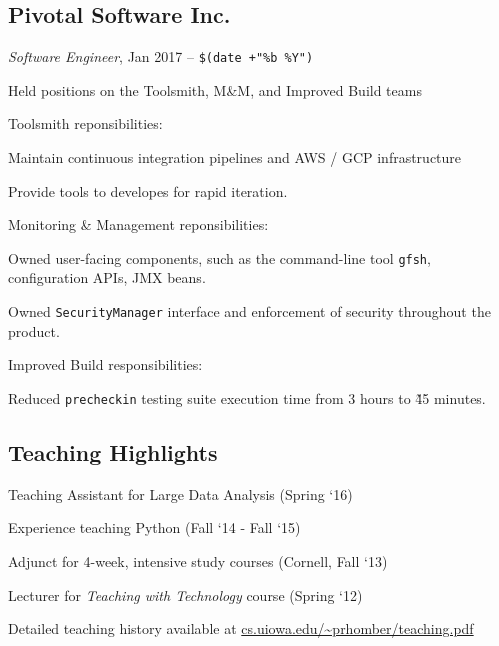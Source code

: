 \documentclass[10pt,letterpaper]{article}
\renewenvironment{itemize}{
  \begin{list}{}{
    \setlength{\leftmargin}{1.5em}
    \setlength{\itemsep}{0.25em}
    \setlength{\parskip}{0pt}
    \setlength{\parsep}{0.25em}
  }
}{
  \end{list}
}
\begin{document}
\subsection*{Pivotal Software Inc.}
\textit{Software Engineer}, Jan 2017 -- \verb!$(date +"%b %Y")!
\begin{itemize}
\item Held positions on the Toolsmith, M\&M, and Improved Build teams
\begin{itemize}
\item Toolsmith reponsibilities:
\begin{itemize}
\item Maintain continuous integration pipelines and AWS / GCP infrastructure
\item Provide tools to developes for rapid iteration.
\end{itemize}
\item Monitoring \& Management reponsibilities:
\begin{itemize}
\item Owned user-facing components, such as the command-line tool \verb!gfsh!, configuration APIs, JMX beans.
\item Owned \verb!SecurityManager! interface and enforcement of security throughout the product.
\end{itemize}
\item Improved Build responsibilities:
\begin{itemize}
\item Reduced \verb!precheckin! testing suite execution time from 3 hours to \~45 minutes.
\end{itemize}
\end{itemize}
\end{itemize}

\subsection*{Teaching Highlights}
\begin{itemize}
\item Teaching Assistant for Large Data Analysis (Spring `16)
\item Experience teaching Python (Fall `14 - Fall `15)
\item Adjunct for 4-week, intensive study courses (Cornell, Fall `13)
\item Lecturer for {\em Teaching with Technology} course (Spring `12)
\item Detailed teaching history available at
  \url{cs.uiowa.edu/~prhomber/teaching.pdf}
\end{itemize}
\end{document}
